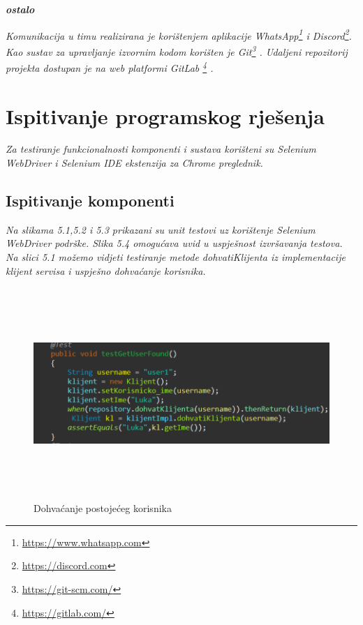 			 \textbf{\textit{ostalo}}
			 \bigskip
			 
				 \textit{	Komunikacija u timu realizirana je korištenjem aplikacije WhatsApp\footnote{\url{https://www.whatsapp.com}} i Discord\footnote{\url{https://discord.com}}. Kao sustav za upravljanje izvornim kodom korišten je Git\footnote{\url{https://git-scm.com/}} . Udaljeni repozitorij projekta dostupan je na web platformi GitLab \footnote{\url{https://gitlab.com/}} .}
			 	
		\newpage
		\section{Ispitivanje programskog rješenja}

			
			 \textit{Za testiranje funkcionalnosti komponenti i sustava korišteni su Selenium WebDriver i Selenium IDE ekstenzija za Chrome preglednik. }
	
			
			\subsection{Ispitivanje komponenti}
			\textit{Na slikama 5.1,5.2 i 5.3 prikazani su unit testovi uz korištenje Selenium WebDriver podrške.  Slika 5.4 omogućava uvid u uspješnost izvršavanja testova.}
		\newline
		\newline
			\textit{Na slici 5.1 možemo vidjeti testiranje metode dohvatiKlijenta iz implementacije klijent servisa i uspješno dohvaćanje korisnika. }
			\begin{figure}[H]
				\centering
				\includegraphics[width=\textwidth,height=8cm]{slike/slike_testova/JUNIT/test1.PNG}
				\caption{Dohvaćanje postojećeg korisnika}
				\label{fig:my_label}
			\end{figure}
		
